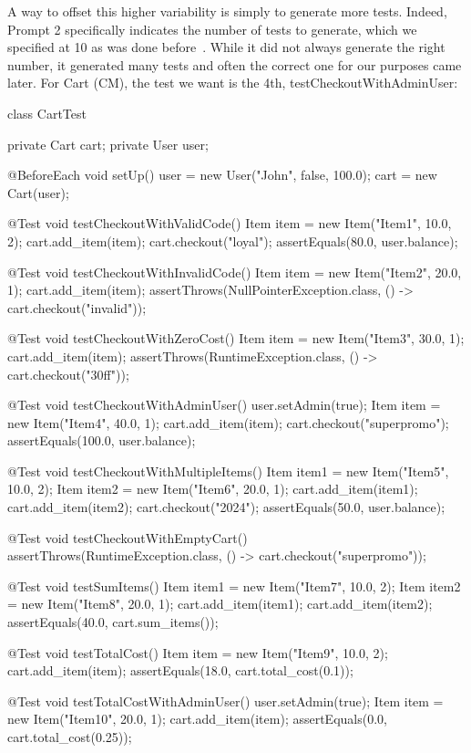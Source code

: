 A way to offset this higher variability is simply to generate more tests. Indeed, Prompt 2 specifically indicates the number of
tests to generate, which we specified at 10 as was done before~\cite{kn:siddiq2023empirical}. While it did not always generate the right number, it generated many
tests and often the correct one for our purposes came later. For Cart (CM), the test we want is the 4th, testCheckoutWithAdminUser:
\begin{response}
    class CartTest {

    private Cart cart;
    private User user;

    @BeforeEach
    void setUp() {
        user = new User("John", false, 100.0);
        cart = new Cart(user);
    }

    @Test
    void testCheckoutWithValidCode() {
        Item item = new Item("Item1", 10.0, 2);
        cart.add_item(item);
        cart.checkout("loyal");
        assertEquals(80.0, user.balance);
    }

    @Test
    void testCheckoutWithInvalidCode() {
        Item item = new Item("Item2", 20.0, 1);
        cart.add_item(item);
        assertThrows(NullPointerException.class, () -> cart.checkout("invalid"));
    }

    @Test
    void testCheckoutWithZeroCost() {
        Item item = new Item("Item3", 30.0, 1);
        cart.add_item(item);
        assertThrows(RuntimeException.class, () -> cart.checkout("30ff"));
    }

    @Test
    void testCheckoutWithAdminUser() {
        user.setAdmin(true);
        Item item = new Item("Item4", 40.0, 1);
        cart.add_item(item);
        cart.checkout("superpromo");
        assertEquals(100.0, user.balance);
    }

    @Test
    void testCheckoutWithMultipleItems() {
        Item item1 = new Item("Item5", 10.0, 2);
        Item item2 = new Item("Item6", 20.0, 1);
        cart.add_item(item1);
        cart.add_item(item2);
        cart.checkout("2024");
        assertEquals(50.0, user.balance);
    }

    @Test
    void testCheckoutWithEmptyCart() {
        assertThrows(RuntimeException.class, () -> cart.checkout("superpromo"));
    }

    @Test
    void testSumItems() {
        Item item1 = new Item("Item7", 10.0, 2);
        Item item2 = new Item("Item8", 20.0, 1);
        cart.add_item(item1);
        cart.add_item(item2);
        assertEquals(40.0, cart.sum_items());
    }

    @Test
    void testTotalCost() {
        Item item = new Item("Item9", 10.0, 2);
        cart.add_item(item);
        assertEquals(18.0, cart.total_cost(0.1));
    }

    @Test
    void testTotalCostWithAdminUser() {
        user.setAdmin(true);
        Item item = new Item("Item10", 20.0, 1);
        cart.add_item(item);
        assertEquals(0.0, cart.total_cost(0.25));
    }
}
\end{response}


